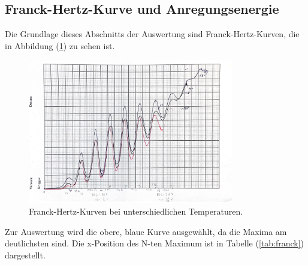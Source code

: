 \subsection{Franck-Hertz-Kurve und Anregungsenergie}
Die Grundlage dieses Abschnitts der Auswertung sind 
Franck-Hertz-Kurven, die in Abbildung (\ref{fig:verschiedene}) zu 
sehen ist. 
\begin{figure}[H]
    \centering
    \includegraphics[width=0.8\textwidth]{content/Bilder/verschiedene.jpeg}
    \caption{Franck-Hertz-Kurven bei unterschiedlichen Temperaturen.}
    \label{fig:verschiedene}
\end{figure}
Zur Auswertung wird die obere, blaue Kurve ausgewählt, da die Maxima 
am deutlichsten sind. Die x-Position des N-ten Maximum ist in Tabelle (\ref{tab:franck}) dargestellt. 

